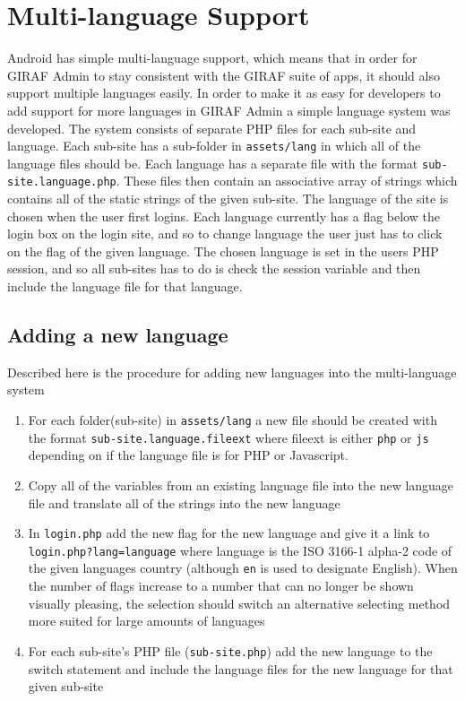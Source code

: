\section{Multi-language Support}
\label{sec:languageSupport}
Android has simple multi-language support, which means that in order for GIRAF Admin to stay consistent with the GIRAF suite of apps, it should also support multiple languages easily. In order to make it as easy for developers to add support for more languages in GIRAF Admin a simple language system was developed. The system consists of separate PHP files for each sub-site and language. Each sub-site has a sub-folder in \texttt{assets/lang} in which all of the language files should be. Each language has a separate file with the format \texttt{sub-site.language.php}. These files then contain an associative array of strings which contains all of the static strings of the given sub-site. The language of the site is chosen when the user first logins. Each language currently has a flag below the login box on the login site, and so to change language the user just has to click on the flag of the given language. The chosen language is set in the users PHP session, and so all sub-sites has to do is check the session variable and then include the language file for that language. \\

\subsection{Adding a new language}
Described here is the procedure for adding new languages into the multi-language system
\begin{enumerate}
\item For each folder(sub-site) in \texttt{assets/lang} a new file should be created with the format \texttt{sub-site.language.fileext} where fileext is either \texttt{php} or \texttt{js} depending on if the language file is for PHP or Javascript.
\item Copy all of the variables from an existing language file into the new language file and translate all of the strings into the new language
\item In \texttt{login.php} add the new flag for the new language and give it a link to \texttt{login.php?lang=language} where language is the ISO 3166-1 alpha-2 code of the given languages country (although \texttt{en} is used to designate English). When the number of flags increase to a number that can no longer be shown visually pleasing, the selection should switch an alternative selecting method more suited for large amounts of languages
\item For each sub-site's PHP file (\texttt{sub-site.php}) add the new language to the switch statement and include the language files for the new language for that given sub-site
\end{enumerate}


